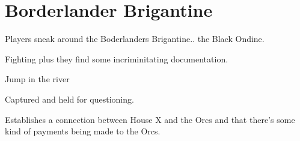 \documentclass[a4paper]{dnd5}
\begin{document}
\section*{Borderlander Brigantine}

\begin{precis}
\item Players sneak around the Boderlanders Brigantine.. the Black Ondine.
\item Fighting plus they find some incriminitating documentation.
\end{precis}


\begin{outs} 
\item Jump in the river
\item Captured and held for questioning.
\end{outs}

\begin{purpose}
\item Establishes a connection between House X and the Orcs and that there's some kind of payments being made to the Orcs.
\item 
\end{purpose}
     
\end{document}
